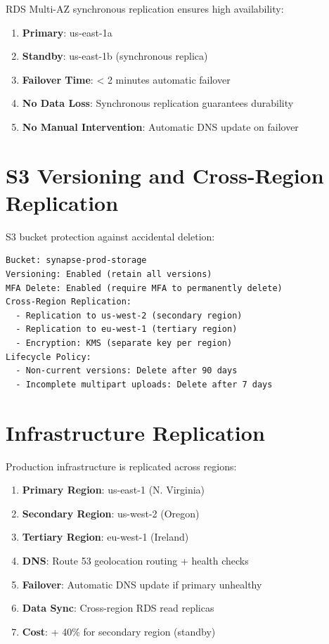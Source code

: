 \documentclass{report}
\begin{document}
RDS Multi-AZ synchronous replication ensures high availability:

\begin{enumerate}
  \item \textbf{Primary}: us-east-1a
  \item \textbf{Standby}: us-east-1b (synchronous replica)
  \item \textbf{Failover Time}: < 2 minutes automatic failover
  \item \textbf{No Data Loss}: Synchronous replication guarantees durability
  \item \textbf{No Manual Intervention}: Automatic DNS update on failover
\end{enumerate}

\section{S3 Versioning and Cross-Region Replication}

S3 bucket protection against accidental deletion:

\begin{lstlisting}[caption=S3 Protection Strategy]
Bucket: synapse-prod-storage
Versioning: Enabled (retain all versions)
MFA Delete: Enabled (require MFA to permanently delete)
Cross-Region Replication:
  - Replication to us-west-2 (secondary region)
  - Replication to eu-west-1 (tertiary region)
  - Encryption: KMS (separate key per region)
Lifecycle Policy:
  - Non-current versions: Delete after 90 days
  - Incomplete multipart uploads: Delete after 7 days
\end{lstlisting}

\section{Infrastructure Replication}

Production infrastructure is replicated across regions:

\begin{enumerate}
  \item \textbf{Primary Region}: us-east-1 (N. Virginia)
  \item \textbf{Secondary Region}: us-west-2 (Oregon)
  \item \textbf{Tertiary Region}: eu-west-1 (Ireland)
  \item \textbf{DNS}: Route 53 geolocation routing + health checks
  \item \textbf{Failover}: Automatic DNS update if primary unhealthy
  \item \textbf{Data Sync}: Cross-region RDS read replicas
  \item \textbf{Cost}: + 40\% for secondary region (standby)
\end{enumerate}
\end{document}
